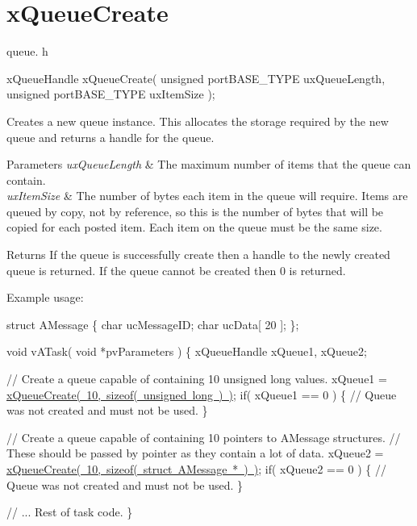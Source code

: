 \hypertarget{group__x_queue_create}{}\section{x\+Queue\+Create}
\label{group__x_queue_create}
queue. h 
\begin{DoxyPre}
xQueueHandle xQueueCreate(
                          unsigned portBASE\_TYPE uxQueueLength,
                          unsigned portBASE\_TYPE uxItemSize
                      );
  \end{DoxyPre}


Creates a new queue instance. This allocates the storage required by the new queue and returns a handle for the queue.


\begin{DoxyParams}{Parameters}
{\em ux\+Queue\+Length} & The maximum number of items that the queue can contain.\\
\hline
{\em ux\+Item\+Size} & The number of bytes each item in the queue will require. Items are queued by copy, not by reference, so this is the number of bytes that will be copied for each posted item. Each item on the queue must be the same size.\\
\hline
\end{DoxyParams}
\begin{DoxyReturn}{Returns}
If the queue is successfully create then a handle to the newly created queue is returned. If the queue cannot be created then 0 is returned.
\end{DoxyReturn}
Example usage\+: 
\begin{DoxyPre}
struct AMessage
\{
   char ucMessageID;
   char ucData[ 20 ];
\};\end{DoxyPre}



\begin{DoxyPre}void vATask( void *pvParameters )
\{
xQueueHandle xQueue1, xQueue2;\end{DoxyPre}



\begin{DoxyPre}   // Create a queue capable of containing 10 unsigned long values.
   xQueue1 = \mbox{\hyperlink{queue_8h_aeb858b824bd74a934ea7ebb81af2a6bb}{xQueueCreate( 10, sizeof( unsigned long ) )}};
   if( xQueue1 == 0 )
   \{
    // Queue was not created and must not be used.
   \}\end{DoxyPre}



\begin{DoxyPre}   // Create a queue capable of containing 10 pointers to AMessage structures.
   // These should be passed by pointer as they contain a lot of data.
   xQueue2 = \mbox{\hyperlink{queue_8h_aeb858b824bd74a934ea7ebb81af2a6bb}{xQueueCreate( 10, sizeof( struct AMessage * ) )}};
   if( xQueue2 == 0 )
   \{
    // Queue was not created and must not be used.
   \}\end{DoxyPre}



\begin{DoxyPre}   // ... Rest of task code.
\}
\end{DoxyPre}
 